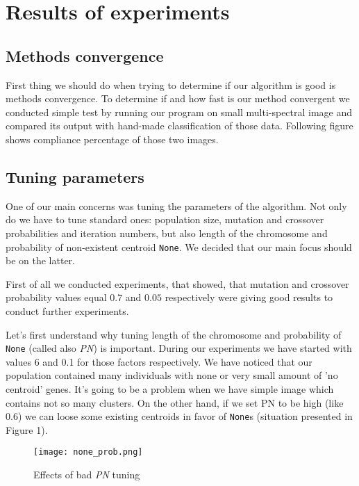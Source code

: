 \documentclass[11pt,leqno]{article}
\theoremstyle{mytheoremstyle}
\theoremstyle{mytheoremstyle}
\begin{document}
\section{Results of experiments}

\subsection{Methods convergence}

First thing we should do when trying to determine if our algorithm is good is methods convergence. To determine if and how fast is our method convergent we conducted simple test by running our program on small multi-spectral image and compared its output with hand-made classification of those data. Following figure shows compliance percentage of those two images.


\subsection{Tuning parameters}

One of our main concerns was tuning the parameters of the algorithm. Not only do we have to tune standard ones: population size, mutation and crossover probabilities and iteration numbers, but also length of the chromosome and probability of non-existent centroid \texttt{None}. We decided that our main focus should be on the latter.

First of all we conducted experiments, that showed, that mutation and crossover probability values equal $0.7$ and $0.05$ respectively were giving good results to conduct further experiments.

Let's first understand why tuning length of the chromosome and probability of \texttt{None} (called also \textit{PN}) is important. During our experiments we have started with values 6 and 0.1 for those factors respectively. We have noticed that our population contained many individuals with none or very small amount of 'no centroid' genes. It's going to be a problem when we have simple image which contains not so many clusters. On the other hand, if we set PN to be high (like 0.6) we can loose some existing centroids in favor of \texttt{None}s (situation presented in Figure 1).

\begin{figure}[h]
\texttt{[image: none\_prob.png]}
\caption{Effects of bad \textit{PN} tuning}
\end{figure}
\end{document}
